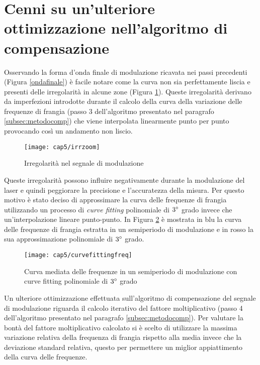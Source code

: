 \section{Cenni su un'ulteriore ottimizzazione nell'algoritmo di compensazione}
Osservando la forma d'onda finale di modulazione ricavata nei passi precedenti (Figura \ref{ondafinale}) è facile notare come la curva non sia perfettamente liscia e presenti delle irregolarità in alcune zone (Figura \ref{irrzoom}).
Queste irregolarità derivano da imperfezioni introdotte durante il calcolo della curva della variazione delle frequenze di frangia (passo $3$ dell'algoritmo presentato nel paragrafo \ref{subsec:metodocomp}) che viene interpolata linearmente punto per punto provocando così un andamento non liscio.
\begin{figure}  
	\begin{center}
		\texttt{[image: cap5/irrzoom]}
		\caption{Irregolarità nel segnale di modulazione}
		\label{irrzoom}
	\end{center}
\end{figure}

Queste irregolarità possono influire negativamente durante la modulazione del laser e quindi peggiorare la precisione e l'accuratezza della misura. Per questo motivo è stato deciso di approssimare la curva delle frequenze di frangia utilizzando un processo di \textit{curve fitting} polinomiale di $3\degree$ grado invece che un'interpolazione lineare punto-punto. In Figura \ref{curvefittingfreq} è mostrata in blu la curva delle frequenze di frangia estratta in un semiperiodo di modulazione e in rosso la sua approssimazione polinomiale di $3\degree$ grado.
\begin{figure}[H]  
	\begin{center}
		\texttt{[image: cap5/curvefittingfreq]}
		\caption{Curva mediata delle frequenze in un semiperiodo di modulazione con curve fitting polinomiale di $3\degree$ grado}
		\label{curvefittingfreq}
	\end{center}
\end{figure}

Un ulteriore ottimizzazione effettuata sull'algoritmo di compensazione del segnale di modulazione riguarda il calcolo iterativo del fattore moltiplicativo (passo 4 dell'algoritmo presentato nel paragrafo \ref{subsec:metodocomp}). Per valutare la bontà del fattore moltiplicativo calcolato si è scelto di utilizzare la massima variazione relativa della frequenza di frangia rispetto alla media invece che la deviazione standard relativa, questo per permettere un miglior appiattimento della curva delle frequenze.

